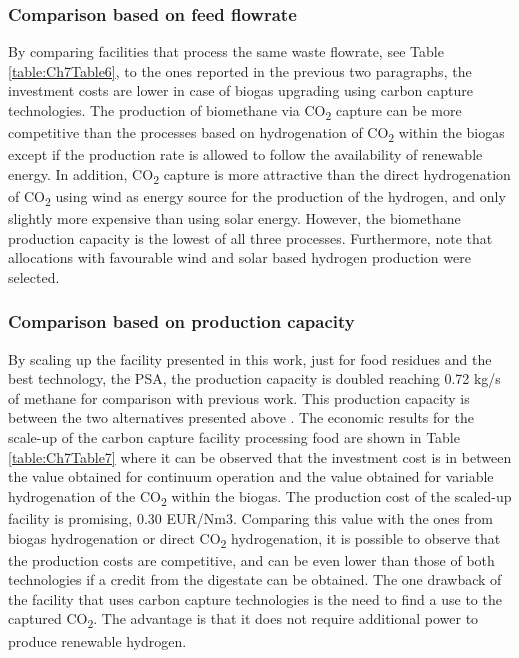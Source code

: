 \begin{refsection}[referencesCh7]
\subsubsection{Comparison based on feed flowrate}
By comparing facilities that process the same waste flowrate, see Table \ref{table:Ch7Table6}, to the ones reported in the previous two paragraphs, the investment costs are lower in case of biogas upgrading using carbon capture technologies. The production of biomethane via CO\textsubscript{2} capture can be more competitive than the processes based on hydrogenation of CO\textsubscript{2} within the biogas except if the production rate is allowed to follow the availability of renewable energy. In addition, CO\textsubscript{2} capture is more attractive than the direct hydrogenation of CO\textsubscript{2} using wind as energy source for the production of the hydrogen, and only slightly more expensive than using solar energy. However, the biomethane production capacity is the lowest of all three processes. Furthermore, note that allocations with favourable wind and solar based hydrogen production were selected.

\subsubsection{Comparison based on production capacity}
By scaling up the facility presented in this work, just for food residues and the best technology, the PSA, the production capacity is doubled reaching 0.72 kg/s of methane for comparison with previous work. This production capacity is between the two alternatives presented above \citep{curto2019renewable,davis2014optimala,davis2014optimalb}. The economic results for the scale-up of the carbon capture facility processing food are shown in Table \ref{table:Ch7Table7} where it can be observed that the investment cost is in between the value obtained for continuum operation and the value obtained for variable hydrogenation of the CO\textsubscript{2} within the biogas. The production cost of the scaled-up facility is promising, 0.30 EUR/Nm3. Comparing this value with the ones from biogas hydrogenation or direct CO\textsubscript{2} hydrogenation, it is possible to observe that the production costs are competitive, and can be even lower than those of both technologies if a credit from the digestate can be obtained. The one drawback of the facility that uses carbon capture technologies is the need to find a use to the captured CO\textsubscript{2}. The advantage is that it does not require additional power to produce renewable hydrogen.


\end{refsection}
